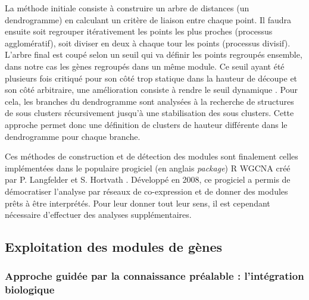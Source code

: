 La méthode initiale \cite{Murtagh2012Jan} consiste à construire un arbre de distances (un dendrogramme) en calculant un critère de liaison entre chaque point. Il faudra ensuite soit regrouper itérativement les points les plus proches (processus agglomératif), soit diviser en deux à chaque tour les points (processus divisif). L'arbre final est coupé selon un seuil qui va définir les points regroupés ensemble, dans notre cas les gènes regroupés dans un même module. Ce seuil ayant été plusieurs fois critiqué pour son côté trop statique dans la hauteur de découpe et son côté arbitraire, une amélioration consiste à rendre le seuil dynamique \cite{Langfelder2008_cutree}. Pour cela, les branches du dendrogramme sont analysées à la recherche de structures de sous clusters récursivement jusqu'à une stabilisation des sous clusters. Cette approche permet donc une définition de clusters de hauteur différente dans le dendrogramme pour chaque branche.



Ces méthodes de construction et de détection des modules sont finalement celles implémentées dans le populaire progiciel (en anglais \textit{package}) R WGCNA créé par P. Langfelder et S. Hortvath \cite{Langfelder2008}. Développé en 2008, ce progiciel a permis de démocratiser l'analyse par réseaux de co-expression et de donner des modules prêts à être interprétés. Pour leur donner tout leur sens, il est cependant nécessaire d'effectuer des analyses supplémentaires.



\subsection{Exploitation des modules de gènes}

\subsubsection{Approche guidée par la connaissance préalable : l'intégration biologique}

